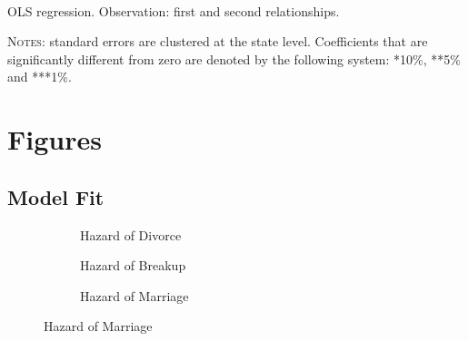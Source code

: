 \documentclass[12pt]{article}
\numberwithin{table}{section}
\begin{document}
\begin{table}[H]\centering
	\caption{\\OLS regression. Observation: first and second relationships.}
	\label{table:wmarc_chil}
	\begin{threeparttable}[t]\centering
		
		\begin{tablenotes}[flushleft]
			\footnotesize{\item \textsc{Notes}: standard errors are clustered at the state level.
				Coefficients that are significantly different from zero are denoted by the following system: *10\%, **5\%  and ***1\%.}
		\end{tablenotes}
	\end{threeparttable}
\end{table}
\FloatBarrier


\section{Figures}


\subsection{Model Fit}


\FloatBarrier
\begin{figure}[H]
\caption{\\Hazards by duration of spells: data and simulations}
\label{fig:haz}
\begin{center}
\begin{subfigure}{.49\textwidth}
\centering
\caption{Hazard of Divorce}
\label{fig:hazd}
\scalebox{0.49}{} 
\end{subfigure}
\begin{subfigure}{.49\textwidth}
\centering
\caption{Hazard of Breakup}
\label{fig:hazs}
\scalebox{0.49}{} 
\end{subfigure}
\end{center}

\hspace{20em}

\begin{center}
\begin{subfigure}{.49\textwidth}
\centering
\caption{Hazard of Marriage}
\label{fig:hazm}
\scalebox{0.49}{} 
\end{subfigure}
\end{center}
\end{figure}
\FloatBarrier
\end{document}

